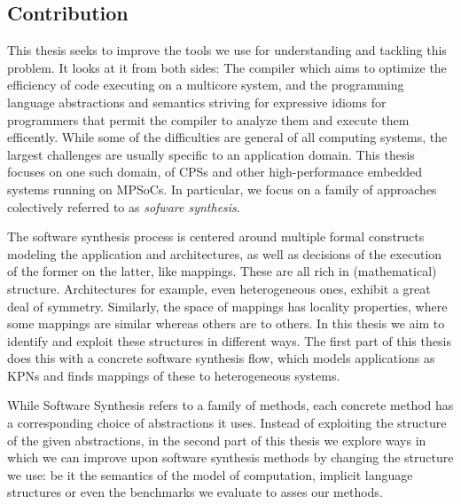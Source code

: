 \subsection{Contribution}

This thesis seeks to improve the tools we use for understanding and tackling this problem.
It looks at it from both sides:
The compiler which aims to optimize the efficiency of code executing on a multicore system,
and the programming language abstractions and semantics striving for expressive idioms for programmers that permit the compiler to analyze them and execute them efficently.
While some of the difficulties are general of all computing systems, the largest challenges are usually specific to an application domain.
This thesis focuses on one such domain, of \acp{CPS} and other high-performance embedded systems running on \acp{MPSoC}.
In particular, we focus on a family of approaches colectively referred to as \emph{sofware synthesis}.


The software synthesis process is centered around multiple formal constructs modeling the application and architectures, as well as decisions of the execution of the former on the latter, like mappings.
These are all rich in (mathematical) structure.
Architectures for example, even heterogeneous ones, exhibit a great deal of symmetry.
Similarly, the space of mappings has locality properties, where some mappings are similar whereas others are to others.
In this thesis we aim to identify and exploit these structures in different ways.
The first part of this thesis does this with a concrete software synthesis flow, which models applications as \acp{KPN} and finds mappings of these to heterogeneous systems.

While Software Synthesis refers to a family of methods, each concrete method has a corresponding choice of abstractions it uses. Instead of exploiting the structure of the given abstractions, in the second part of this thesis we explore ways in which we can improve upon software synthesis methods by changing the structure we use: be it the semantics of the model of computation, implicit language structures or even the benchmarks we evaluate to asses our methods.


